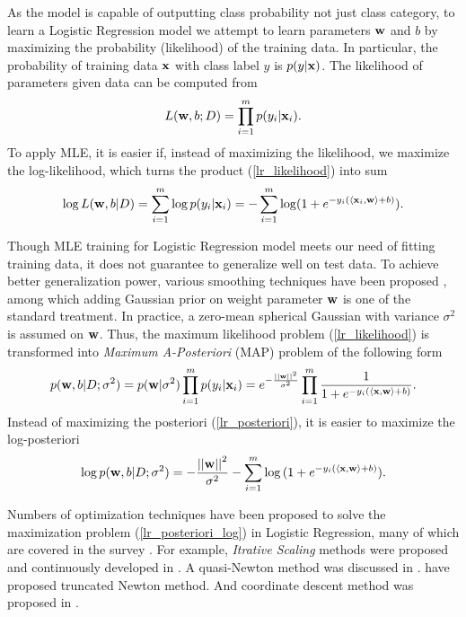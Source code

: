 {%
As the model is capable of outputting class probability not just class category, to learn a Logistic Regression model we attempt to learn parameters $\mathbf {w}$ and $b$ by maximizing the probability (likelihood) of the training data.
In particular, the probability of training data $\mathbf {x}$ with class label $y$ is $p(y|\mathbf {x})$.
The likelihood of parameters given data can be computed from
\begin{align}
	L(\mathbf {w},b;D) = \prod_{i=1}^mp(y_i|\mathbf {x}_i). \label{lr_likelihood}
\end{align}
To apply MLE, it is easier if, instead of maximizing the likelihood, we maximize the log-likelihood, which turns the product (\ref{lr_likelihood}) into sum
\begin{align}
	\log L(\mathbf {w},b|D) = \sum_{i=1}^{m}\log p(y_i|\mathbf {x}_i) = -\sum_{i=1}^{m}\log (1+e^{ -y_i(\langle \mathbf {x}_i, \mathbf {w} \rangle+b) }) \label{lr_likelihood_sum}.
\end{align}

Though MLE training for Logistic Regression model meets our need of fitting training data, it does not guarantee to generalize well on test data.
To achieve better generalization power, various smoothing techniques have been proposed \citep{Chen99,Chen00,Goodman03}, among which adding Gaussian prior on weight parameter $\mathbf {w}$ is one of the standard treatment.
In practice, a zero-mean spherical Gaussian with variance $\sigma^2$ is assumed on $\mathbf {w}$.
Thus, the maximum likelihood problem (\ref{lr_likelihood}) is transformed into \textit{Maximum A-Posteriori} (MAP) problem of the following form
\begin{align}
	p(\mathbf {w},b|D;\sigma^2) = p(\mathbf {w}|\sigma^2)\prod_{i=1}^mp(y_i|\mathbf {x}_i)=e^{ -\frac{\left|\left| \mathbf {w} \right|\right|^2}{\sigma^2} }\prod_{i=1}^{m}{\frac{1}{1+e^{ -y_i(\langle \mathbf {x}, \mathbf {w} \rangle+b) }}}. \label{lr_posteriori}
\end{align}
Instead of maximizing the posteriori (\ref{lr_posteriori}), it is easier to maximize the log-posteriori
\begin{align}
	\log p(\mathbf {w},b|D;\sigma^2) = -{\frac{\left|\left| \mathbf {w} \right|\right|^2}{\sigma^2}} - \sum_{i=1}^{m}\log{(1+e^{ -y_i(\langle \mathbf {x}, \mathbf {w}\rangle+b) })}. \label{lr_posteriori_log}
\end{align}

Numbers of optimization techniques have been proposed to solve the maximization problem (\ref{lr_posteriori_log}) in Logistic Regression, many of which are covered in the survey \citep{Minka03}.
For example, \textit{Itrative Scaling} methods were proposed and continuously developed in \citep{Darroch72,Pietra97inducing,Berger97,Goodman02Sequential,Jin03a}.
A quasi-Newton method was discussed in \citep{Minka03}.
\citet{Komarek05making,Lin2008trust} have proposed truncated Newton method.
And coordinate descent method was proposed in \citep{Huang09iterative}.

}
